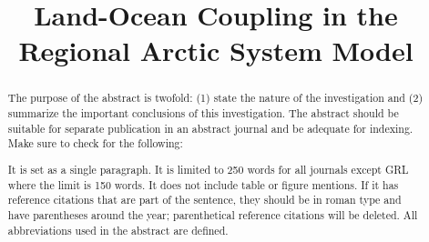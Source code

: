 \documentclass[ms, draft]{agutex}
\begin{document}
%
%


\title{Land-Ocean Coupling in the Regional Arctic System Model}

%
%







%
%


\begin{abstract}
The purpose of the abstract is twofold: (1) state the nature of the investigation and (2) summarize the important conclusions of this investigation. The abstract should be suitable for separate publication in an abstract journal and be adequate for indexing. Make sure to check for the following:

It is set as a single paragraph.
It is limited to 250 words for all journals except GRL where the limit is 150 words.
It does not include table or figure mentions.
If it has reference citations that are part of the sentence, they should be in roman type and have parentheses around the year; parenthetical reference citations will be deleted.
All abbreviations used in the abstract are defined.
\end{abstract}

%
%
\end{document}
